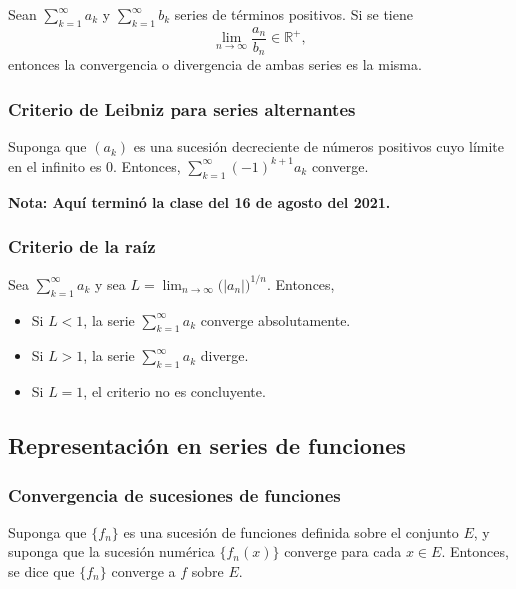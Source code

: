 \documentclass{article}
\begin{document}
Sean $\displaystyle \sum_{k=1}^{\infty}a_k$ y $\displaystyle \sum_{k=1}^{\infty}b_k$ series de términos positivos. Si se tiene 
$$\lim_{n\to\infty} \frac{a_n}{b_n}\in\mathbb{R}^{+},$$
entonces la convergencia o divergencia de ambas series es la misma.

\subsubsection*{Criterio de Leibniz para series alternantes}

Suponga que $(a_k)$ es una sucesión decreciente de números positivos cuyo límite en el infinito es 0. Entonces, $\displaystyle \sum_{k=1}^{\infty}(-1)^{k+1} a_k$ converge.

\vspace{10pt}
\textbf{Nota: Aquí terminó la clase del 16 de agosto del 2021.}

\subsubsection*{Criterio de la raíz}

Sea $\displaystyle \sum_{k=1}^{\infty}a_k$ y sea $L=\displaystyle\lim_{n\to\infty}\big(|a_n|\big)^{1/n}$. Entonces,
\begin{itemize}

\item Si $L<1$, la serie $\displaystyle \sum_{k=1}^{\infty}a_k$ converge absolutamente.

\item Si $L>1$, la serie $\displaystyle \sum_{k=1}^{\infty}a_k$ diverge.

\item Si $L=1$, el criterio no es concluyente.

\end{itemize}

\subsection*{Representación en series de funciones}

\subsubsection*{Convergencia de sucesiones de funciones}

Suponga que $\{f_n\}$ es una sucesión de funciones definida sobre el conjunto $E$, y suponga que la sucesión numérica $\{f_n(x)\}$ converge para cada $x\in E$. Entonces, se dice que $\{f_n\}$ converge a $f$ sobre $E$.
\end{document}
